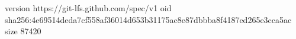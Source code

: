 version https://git-lfs.github.com/spec/v1
oid sha256:4e69514deda7cf558af36014d653b31175ac8e87dbbba8f4187ed265e3cca5ac
size 87420
